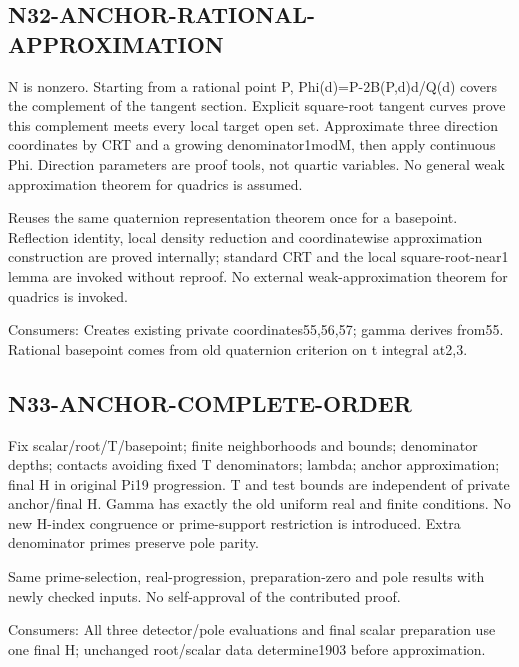 \documentclass{article}
\begin{document}
\subsection{N32-ANCHOR-RATIONAL-APPROXIMATION}
\label{outline:r4-n32-anchor-rational-approximation}
N is nonzero. Starting from a rational point P, Phi(d)=P-2B(P,d)d/Q(d) covers the complement of the tangent section. Explicit square-root tangent curves prove this complement meets every local target open set. Approximate three direction coordinates by CRT and a growing denominator1modM, then apply continuous Phi. Direction parameters are proof tools, not quartic variables. No general weak approximation theorem for quadrics is assumed.
\par Reuses the same quaternion representation theorem once for a basepoint. Reflection identity, local density reduction and coordinatewise approximation construction are proved internally; standard CRT and the local square-root-near1 lemma are invoked without reproof. No external weak-approximation theorem for quadrics is invoked.
\par Consumers: Creates existing private coordinates55,56,57; gamma derives from55. Rational basepoint comes from old quaternion criterion on t integral at2,3.
\subsection{N33-ANCHOR-COMPLETE-ORDER}
\label{outline:r4-n33-anchor-complete-order}
Fix scalar/root/T/basepoint; finite neighborhoods and bounds; denominator depths; contacts avoiding fixed T denominators; lambda; anchor approximation; final H in original Pi19 progression. T and test bounds are independent of private anchor/final H. Gamma has exactly the old uniform real and finite conditions. No new H-index congruence or prime-support restriction is introduced. Extra denominator primes preserve pole parity.
\par Same prime-selection, real-progression, preparation-zero and pole results with newly checked inputs. No self-approval of the contributed proof.
\par Consumers: All three detector/pole evaluations and final scalar preparation use one final H; unchanged root/scalar data determine1903 before approximation.
\end{document}

